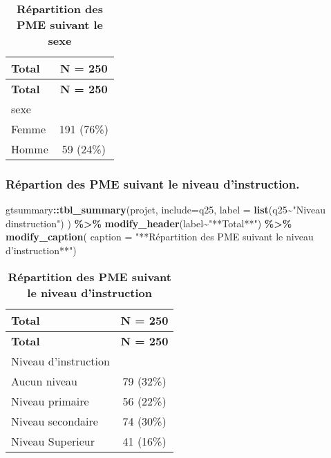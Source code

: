 \documentclass[
]{article}
\newenvironment{Shaded}{\begin{snugshade}}{\end{snugshade}}
\newcommand{\AttributeTok}[1]{\textcolor[rgb]{0.13,0.29,0.53}{#1}}
\newcommand{\FunctionTok}[1]{\textcolor[rgb]{0.13,0.29,0.53}{\textbf{#1}}}
\newcommand{\NormalTok}[1]{#1}
\newcommand{\SpecialCharTok}[1]{\textcolor[rgb]{0.81,0.36,0.00}{\textbf{#1}}}
\newcommand{\StringTok}[1]{\textcolor[rgb]{0.31,0.60,0.02}{#1}}
\begin{document}
\begin{longtable}[]{@{}lc@{}}
\caption{\textbf{Répartition des PME suivant le sexe}}\tabularnewline
\toprule\noalign{}
\textbf{Total} & \textbf{N = 250} \\
\midrule\noalign{}
\endfirsthead
\toprule\noalign{}
\textbf{Total} & \textbf{N = 250} \\
\midrule\noalign{}
\endhead
\bottomrule\noalign{}
\endlastfoot
sexe & \\
Femme & 191 (76\%) \\
Homme & 59 (24\%) \\
\end{longtable}

\hypertarget{ruxe9partion-des-pme-suivant-le-niveau-dinstruction.}{%
\subsubsection{Répartion des PME suivant le niveau
d'instruction.}\label{ruxe9partion-des-pme-suivant-le-niveau-dinstruction.}}

\begin{Shaded}
\begin{Highlighting}[]
\NormalTok{gtsummary}\SpecialCharTok{::}\FunctionTok{tbl\_summary}\NormalTok{(projet, }\AttributeTok{include=}\NormalTok{q25, }\AttributeTok{label =} \FunctionTok{list}\NormalTok{(q25}\SpecialCharTok{\textasciitilde{}}\StringTok{"Niveau d\textquotesingle{}instruction"}\NormalTok{)}
\NormalTok{            ) }\SpecialCharTok{\%\textgreater{}\%} \FunctionTok{modify\_header}\NormalTok{(label}\SpecialCharTok{\textasciitilde{}}\StringTok{"**Total**"}\NormalTok{) }\SpecialCharTok{\%\textgreater{}\%} \FunctionTok{modify\_caption}\NormalTok{(}
              \AttributeTok{caption =} \StringTok{"**Répartition des PME suivant }
\StringTok{              le niveau d’instruction**"}\NormalTok{)}
\end{Highlighting}
\end{Shaded}

\begin{longtable}[]{@{}lc@{}}
\caption{\textbf{Répartition des PME suivant le niveau
d'instruction}}\tabularnewline
\toprule\noalign{}
\textbf{Total} & \textbf{N = 250} \\
\midrule\noalign{}
\endfirsthead
\toprule\noalign{}
\textbf{Total} & \textbf{N = 250} \\
\midrule\noalign{}
\endhead
\bottomrule\noalign{}
\endlastfoot
Niveau d'instruction & \\
Aucun niveau & 79 (32\%) \\
Niveau primaire & 56 (22\%) \\
Niveau secondaire & 74 (30\%) \\
Niveau Superieur & 41 (16\%) \\
\end{longtable}
\end{document}
